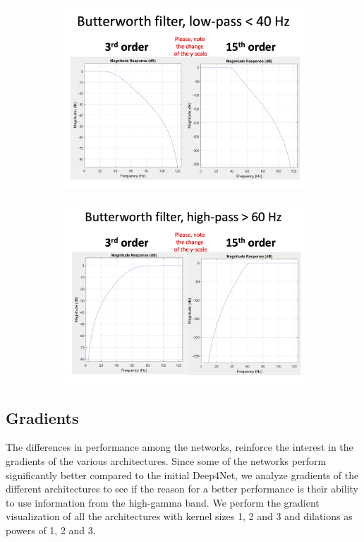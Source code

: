 \begin{figure}[!htpb]
\centering
\begin{subfigure}[b]{0.65\textwidth}
   \includegraphics[width=1\linewidth]{img/ch3/lp-butterworth-filter}
   \caption{}
\end{subfigure}

\begin{subfigure}[b]{0.65\textwidth}
   \includegraphics[width=1\linewidth]{img/ch3/hp-butterworth-filter}
   \caption{}
\end{subfigure}
\caption[]{}
\end{figure}\label{fig:filters}

\subsection{Gradients}\label{subsec:gradients}
The differences in performance among the networks, reinforce the interest in the gradients of the various architectures.
Since some of the networks perform significantly better compared to the initial Deep4Net, we analyze gradients of the different architectures to see if the reason for a better performance is their ability to use information from the high-gamma band.
We perform the gradient visualization of all the architectures with kernel sizes 1, 2 and 3 and dilations as powers of 1, 2 and 3.

